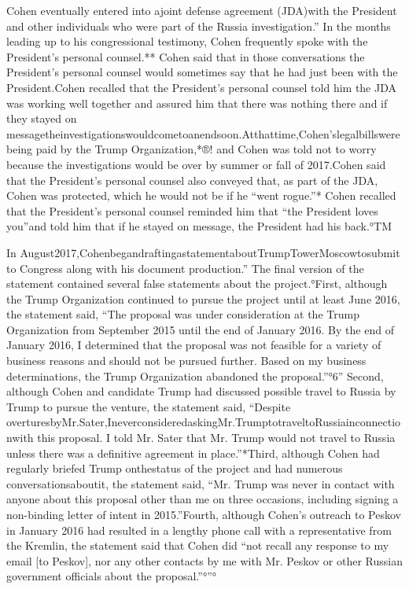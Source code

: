 Cohen eventually entered into ajoint defense agreement (JDA)with the President and other individuals who were part of the Russia investigation.” In the months leading up to his congressional testimony, Cohen frequently spoke with the President's personal counsel.** Cohen said that in those conversations the President's personal counsel would sometimes say that he had just been with the President.Cohen recalled that the President's personal counsel told him the JDA was working well together and assured him that there was nothing there and if they stayed on messagetheinvestigationswouldcometoanendsoon.Atthattime,Cohen'slegalbillswere being paid by the Trump Organization,*®! and Cohen was told not to worry because the investigations would be over by summer or fall of 2017.Cohen said that the President's personal counsel also conveyed that, as part of the JDA, Cohen was protected, which he would not be if he “went rogue.”* Cohen recalled that the President's personal counsel reminded him that “the President loves you”and told him that if he stayed on message, the President had his back.°TM

In August2017,CohenbegandraftingastatementaboutTrumpTowerMoscowtosubmit to Congress along with his document production.” The final version of the statement contained several false statements about the project.°First, although the Trump Organization continued to pursue the project until at least June 2016, the statement said, “The proposal was under consideration at the Trump Organization from September 2015 until the end of January 2016. By the end of January 2016, I determined that the proposal was not feasible for a variety of business reasons and should not be pursued further. Based on my business determinations, the Trump Organization abandoned the proposal.”°6” Second, although Cohen and candidate Trump had discussed possible travel to Russia by Trump to pursue the venture, the statement said, “Despite overturesbyMr.Sater,IneverconsideredaskingMr.TrumptotraveltoRussiainconnectionwith this proposal. I told Mr. Sater that Mr. Trump would not travel to Russia unless there was a definitive agreement in place.”*Third, although Cohen had regularly briefed Trump onthestatus of the project and had numerous conversationsaboutit, the statement said, “Mr. Trump was never in contact with anyone about this proposal other than me on three occasions, including signing a non-binding letter of intent in 2015.”Fourth, although Cohen's outreach to Peskov in January 2016 had resulted in a lengthy phone call with a representative from the Kremlin, the statement said that Cohen did “not recall any response to my email [to Peskov], nor any other contacts by me with Mr. Peskov or other Russian government officials about the proposal.”°”°

